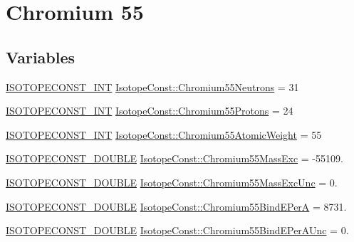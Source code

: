 \hypertarget{group___isotope_const-_chromium-_cr55}{}\section{Chromium 55}
\label{group___isotope_const-_chromium-_cr55}
\subsection*{Variables}
\begin{DoxyCompactItemize}
\item 
\mbox{\hyperlink{group___isotope_const-_macros_ga5f18360b3e99483a35c32d789e62621c}{I\+S\+O\+T\+O\+P\+E\+C\+O\+N\+S\+T\+\_\+\+I\+NT}} \mbox{\hyperlink{group___isotope_const-_chromium-_cr55_ga699ef87146e2295c283ab978b2e8f9f7}{Isotope\+Const\+::\+Chromium55\+Neutrons}} = 31
\item 
\mbox{\hyperlink{group___isotope_const-_macros_ga5f18360b3e99483a35c32d789e62621c}{I\+S\+O\+T\+O\+P\+E\+C\+O\+N\+S\+T\+\_\+\+I\+NT}} \mbox{\hyperlink{group___isotope_const-_chromium-_cr55_ga9d09817317084917d239b4b5f9388029}{Isotope\+Const\+::\+Chromium55\+Protons}} = 24
\item 
\mbox{\hyperlink{group___isotope_const-_macros_ga5f18360b3e99483a35c32d789e62621c}{I\+S\+O\+T\+O\+P\+E\+C\+O\+N\+S\+T\+\_\+\+I\+NT}} \mbox{\hyperlink{group___isotope_const-_chromium-_cr55_ga48a5785f611dd3dc1adcb9368db0c6df}{Isotope\+Const\+::\+Chromium55\+Atomic\+Weight}} = 55
\item 
\mbox{\hyperlink{group___isotope_const-_macros_ga8f45a7272ce02c0b4c65c44636ed719a}{I\+S\+O\+T\+O\+P\+E\+C\+O\+N\+S\+T\+\_\+\+D\+O\+U\+B\+LE}} \mbox{\hyperlink{group___isotope_const-_chromium-_cr55_gaf86755645af37a34d2b3c0112b8941a7}{Isotope\+Const\+::\+Chromium55\+Mass\+Exc}} = -\/55109.
\item 
\mbox{\hyperlink{group___isotope_const-_macros_ga8f45a7272ce02c0b4c65c44636ed719a}{I\+S\+O\+T\+O\+P\+E\+C\+O\+N\+S\+T\+\_\+\+D\+O\+U\+B\+LE}} \mbox{\hyperlink{group___isotope_const-_chromium-_cr55_gac7437a09b25e92fdd2e3306d14e025a6}{Isotope\+Const\+::\+Chromium55\+Mass\+Exc\+Unc}} = 0.
\item 
\mbox{\hyperlink{group___isotope_const-_macros_ga8f45a7272ce02c0b4c65c44636ed719a}{I\+S\+O\+T\+O\+P\+E\+C\+O\+N\+S\+T\+\_\+\+D\+O\+U\+B\+LE}} \mbox{\hyperlink{group___isotope_const-_chromium-_cr55_ga697d3d6f8e7045f2dac462508fa0aebb}{Isotope\+Const\+::\+Chromium55\+Bind\+E\+PerA}} = 8731.
\item 
\mbox{\hyperlink{group___isotope_const-_macros_ga8f45a7272ce02c0b4c65c44636ed719a}{I\+S\+O\+T\+O\+P\+E\+C\+O\+N\+S\+T\+\_\+\+D\+O\+U\+B\+LE}} \mbox{\hyperlink{group___isotope_const-_chromium-_cr55_ga909062d357866428baed097b95c33530}{Isotope\+Const\+::\+Chromium55\+Bind\+E\+Per\+A\+Unc}} = 0.

\end{DoxyCompactItemize}

